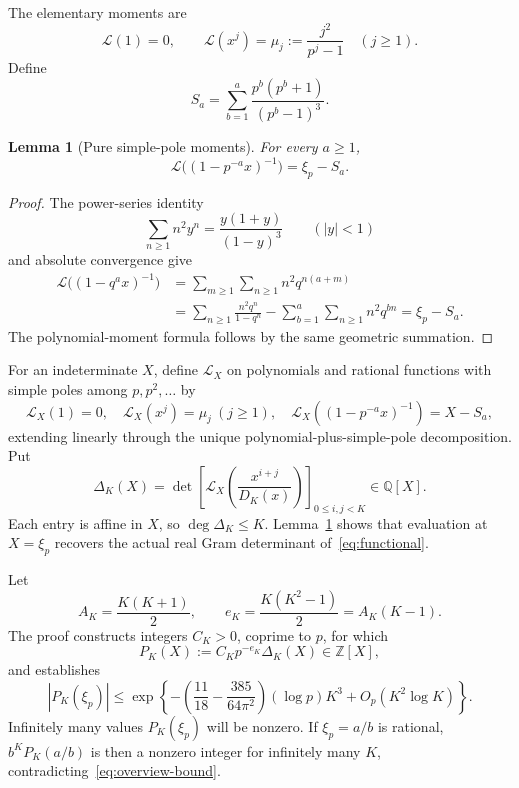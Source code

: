 \documentclass[11pt,letterpaper]{article}
\numberwithin{equation}{section}
\newtheorem{lemma}[theorem]{Lemma}
\theoremstyle{remark}
\newcommand{\Z}{\mathbb Z}
\newcommand{\Q}{\mathbb Q}
\newcommand{\Lcal}{\mathcal L}
\begin{document}
The elementary moments are
\begin{equation}\label{eq:poly-moments}
 \Lcal(1)=0,\qquad
 \Lcal(x^j)=\mu_j:=\frac{j^2}{p^j-1}\quad(j\ge1).
\end{equation}
Define
\begin{equation}\label{eq:Sa}
 S_a=\sum_{b=1}^a\frac{p^b(p^b+1)}{(p^b-1)^3}.
\end{equation}

\begin{lemma}[Pure simple-pole moments]\label{lem:purity}
For every $a\ge1$,
\begin{equation*}
 \Lcal\bigl((1-p^{-a}x)^{-1}\bigr)=\xi_p-S_a.
\end{equation*}
\end{lemma}
\begin{proof}
The power-series identity
\begin{equation*}
 \sum_{n\ge1}n^2y^n=\frac{y(1+y)}{(1-y)^3}\qquad(|y|<1)
\end{equation*}
and absolute convergence give
\begin{align*}
 \Lcal\bigl((1-q^a x)^{-1}\bigr)
 &=\sum_{m\ge1}\sum_{n\ge1}n^2q^{n(a+m)}\\
 &=\sum_{n\ge1}\frac{n^2q^n}{1-q^n}
   -\sum_{b=1}^a\sum_{n\ge1}n^2q^{bn}
 =\xi_p-S_a.
\end{align*}
The polynomial-moment formula follows by the same geometric summation.
\end{proof}

For an indeterminate $X$, define $\Lcal_X$ on polynomials and rational functions with simple poles among $p,p^2,\ldots$ by
\begin{equation}\label{eq:formal-functional}
 \Lcal_X(1)=0,\quad \Lcal_X(x^j)=\mu_j\ (j\ge1),\quad
 \Lcal_X((1-p^{-a}x)^{-1})=X-S_a,
\end{equation}
extending linearly through the unique polynomial-plus-simple-pole decomposition. Put
\begin{equation}\label{eq:Delta}
 \Delta_K(X)=\det\left[
 \Lcal_X\left(\frac{x^{i+j}}{D_K(x)}\right)
 \right]_{0\le i,j<K}\in\Q[X].
\end{equation}
Each entry is affine in $X$, so $\deg\Delta_K\le K$. Lemma~\ref{lem:purity} shows that evaluation at $X=\xi_p$ recovers the actual real Gram determinant of~\eqref{eq:functional}.

Let
\begin{equation}\label{eq:Edef}
 A_K=\frac{K(K+1)}2,\qquad
 e_K=\frac{K(K^2-1)}2=A_K(K-1).
\end{equation}
The proof constructs integers $C_K>0$, coprime to $p$, for which
\begin{equation*}
 P_K(X):=C_Kp^{-e_K}\Delta_K(X)\in\Z[X],
\end{equation*}
and establishes
\begin{equation}\label{eq:overview-bound}
 |P_K(\xi_p)|\le
 \exp\left\{-\left(\frac{11}{18}-\frac{385}{64\pi^2}\right)
 (\log p)K^3+O_p(K^2\log K)\right\}.
\end{equation}
Infinitely many values $P_K(\xi_p)$ will be nonzero. If $\xi_p=a/b$ is rational, $b^KP_K(a/b)$ is then a nonzero integer for infinitely many $K$, contradicting~\eqref{eq:overview-bound}.
\end{document}
